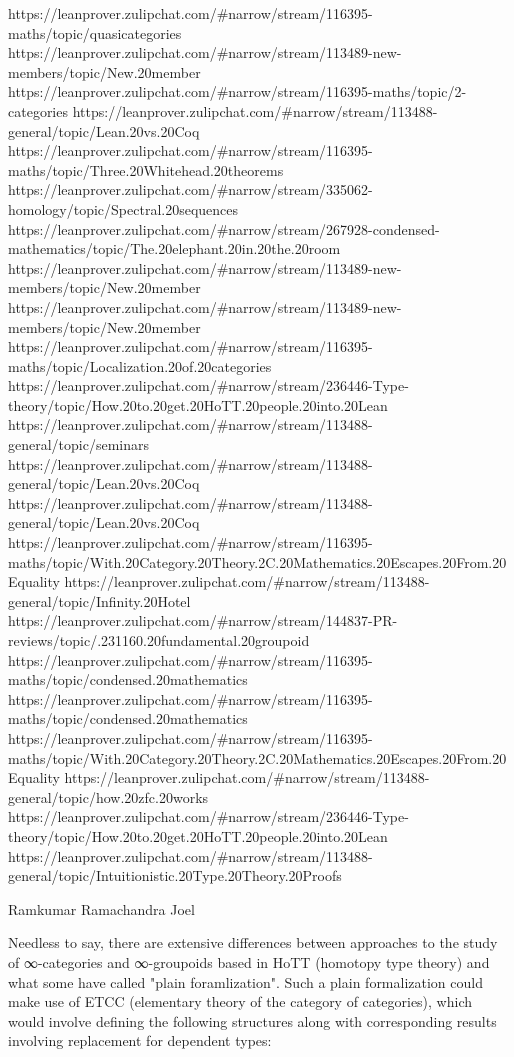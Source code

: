 \documentclass{book}
\begin{document}
https://leanprover.zulipchat.com/#narrow/stream/116395-maths/topic/quasicategories
https://leanprover.zulipchat.com/#narrow/stream/113489-new-members/topic/New.20member
https://leanprover.zulipchat.com/#narrow/stream/116395-maths/topic/2-categories
https://leanprover.zulipchat.com/#narrow/stream/113488-general/topic/Lean.20vs.20Coq
https://leanprover.zulipchat.com/#narrow/stream/116395-maths/topic/Three.20Whitehead.20theorems
https://leanprover.zulipchat.com/#narrow/stream/335062-homology/topic/Spectral.20sequences
https://leanprover.zulipchat.com/#narrow/stream/267928-condensed-mathematics/topic/The.20elephant.20in.20the.20room
https://leanprover.zulipchat.com/#narrow/stream/113489-new-members/topic/New.20member
https://leanprover.zulipchat.com/#narrow/stream/113489-new-members/topic/New.20member
https://leanprover.zulipchat.com/#narrow/stream/116395-maths/topic/Localization.20of.20categories
https://leanprover.zulipchat.com/#narrow/stream/236446-Type-theory/topic/How.20to.20get.20HoTT.20people.20into.20Lean
https://leanprover.zulipchat.com/#narrow/stream/113488-general/topic/seminars
https://leanprover.zulipchat.com/#narrow/stream/113488-general/topic/Lean.20vs.20Coq
https://leanprover.zulipchat.com/#narrow/stream/113488-general/topic/Lean.20vs.20Coq
https://leanprover.zulipchat.com/#narrow/stream/116395-maths/topic/With.20Category.20Theory.2C.20Mathematics.20Escapes.20From.20Equality
https://leanprover.zulipchat.com/#narrow/stream/113488-general/topic/Infinity.20Hotel
https://leanprover.zulipchat.com/#narrow/stream/144837-PR-reviews/topic/.231160.20fundamental.20groupoid
https://leanprover.zulipchat.com/#narrow/stream/116395-maths/topic/condensed.20mathematics
https://leanprover.zulipchat.com/#narrow/stream/116395-maths/topic/condensed.20mathematics
https://leanprover.zulipchat.com/#narrow/stream/116395-maths/topic/With.20Category.20Theory.2C.20Mathematics.20Escapes.20From.20Equality
https://leanprover.zulipchat.com/#narrow/stream/113488-general/topic/how.20zfc.20works
https://leanprover.zulipchat.com/#narrow/stream/236446-Type-theory/topic/How.20to.20get.20HoTT.20people.20into.20Lean
https://leanprover.zulipchat.com/#narrow/stream/113488-general/topic/Intuitionistic.20Type.20Theory.20Proofs

Ramkumar Ramachandra
Joel

Needless to say, there are extensive differences between approaches to the study of ∞-categories and ∞-groupoids based in HoTT (homotopy type theory) and what some have called "plain foramlization". Such a plain formalization could make use of ETCC (elementary theory of the category of categories), which would involve defining the following structures along with corresponding results involving replacement for dependent types:
\end{document}
